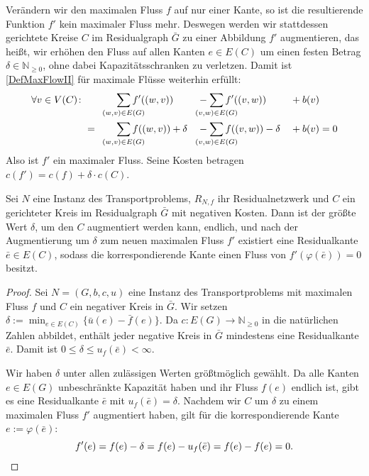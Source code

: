 Verändern wir den maximalen Fluss $f$ auf nur einer Kante, so ist die resultierende Funktion $f'$ kein maximaler Fluss mehr. Deswegen werden wir stattdessen gerichtete Kreise $C$ im Residualgraph $\bar{G}$ zu einer Abbildung $f'$ augmentieren, das heißt, wir erhöhen den Fluss auf allen Kanten $e\in E(C)$ um einen festen Betrag $\delta\in\mathbb{N}_{\geq0}$, ohne dabei Kapazitätsschranken zu verletzen. Damit ist \cref{DefMaxFlowII} für maximale Flüsse weiterhin erfüllt:
\begin{alignat*}{4}
\forall v\in V(C)\colon&&&\sum_{\mathclap{(w,v)\in E(G)}} f'((w,v)) &&-\sum_{\mathclap{(v,w)\in E(G)}} f'((v,w)) &&+ b(v)\\
&=\quad&&\sum_{\mathclap{(w,v)\in E(G)}} f((w,v)) + \delta &&-\sum_{\mathclap{(v,w)\in E(G)}} f((v,w)) - \delta &&+ b(v) = 0\end{alignat*}
Also ist $f'$ ein maximaler Fluss. Seine Kosten betragen $c(f')=c(f) + \delta\cdot c(C)$.

\begin{lem}\label{negKreis}Sei $N$ eine Instanz des Transportproblems, $R_{N,f}$ ihr Residualnetzwerk und $C$ ein gerichteter Kreis im Residualgraph $\bar{G}$ mit negativen Kosten. Dann ist der größte Wert $\delta$, um den $C$ augmentiert werden kann, endlich, und nach der Augmentierung um $\delta$ zum neuen maximalen Fluss $f'$ existiert eine Residualkante $\bar{e}\in E(C)$, sodass die korrespondierende Kante einen Fluss von $f'(\varphi(\bar{e}))=0$ besitzt. 
\end{lem}
\begin{proof}Sei $N=(G,b,c,u)$ eine Instanz des Transportproblems mit maximalen Fluss $f$ und $C$ ein negativer Kreis in $\bar{G}$. Wir setzen $\delta:=\min_{e\in E(C)}\{\bar{u}(e)-\bar{f}(e)\}$. Da $c\colon E(G)\rightarrow\mathbb{N}_{\geq0}$ in die natürlichen Zahlen abbildet, enthält jeder negative Kreis in $\bar{G}$ mindestens eine Residualkante $\bar{e}$. Damit ist $0\leq\delta\leq u_f(\bar{e})<\infty$.

Wir haben $\delta$ unter allen zulässigen Werten größtmöglich gewählt. Da alle Kanten $e\in E(G)$ unbeschränkte Kapazität haben und ihr Fluss $f(e)$ endlich ist, gibt es eine Residualkante $\bar{e}$ mit $u_f(\bar{e})=\delta$. Nachdem wir $C$ um $\delta$ zu einem maximalen Fluss $f'$ augmentiert haben, gilt für die korrespondierende Kante $e:=\varphi(\bar{e})$:
\begin{equation*}
f'(e)=f(e)-\delta=f(e)-u_f(\bar{e})=f(e)-f(e)=0.\qedhere
\end{equation*}\end{proof}

